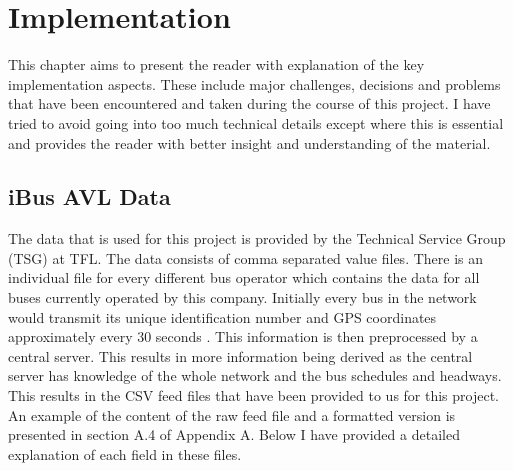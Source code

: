 \chapter{Implementation}
This chapter aims to present the reader with explanation of the key implementation aspects. These include major challenges, decisions and problems that have been encountered and taken during the course of this project. I have tried to avoid going into too much technical details except where this is essential and provides the reader with better insight and understanding of the material.

\section{iBus AVL Data}
The data that is used for this project is provided by the Technical Service Group (TSG) at TFL. The data consists of comma separated value files. There is an individual file for every different bus operator which contains the data for all buses currently operated by this company. Initially every bus in the network would transmit its unique identification number and GPS coordinates approximately every 30 seconds \cite{Hounsell201276}. This information is then preprocessed by a central server. This results in more information being derived as the central server has knowledge of the whole network and the bus schedules and headways. This results in the CSV feed files that have been provided to us for this project. An example of the content of the raw feed file and a formatted version is presented in section A.4 of Appendix A. Below I have provided a detailed explanation of each field in these files.
